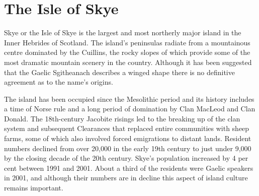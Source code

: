 \documentclass{article}
\begin{document}
\section{The Isle of Skye}

Skye or the Isle of Skye is the largest and most northerly major island
in the Inner Hebrides of Scotland. The island's peninsulas radiate from
a mountainous centre dominated by the Cuillins, the rocky slopes of
which provide some of the most dramatic mountain scenery in the country.
Although it has been suggested that the Gaelic Sgitheanach describes a
winged shape there is no definitive agreement as to the name's origins.

The island has been occupied since the Mesolithic period and its history
includes a time of Norse rule and a long period of domination by Clan
MacLeod and Clan Donald. The 18th-century Jacobite risings led to the
breaking up of the clan system and subsequent Clearances that replaced
entire communities with sheep farms, some of which also involved forced
emigrations to distant lands. Resident numbers declined from over 20,000
in the early 19th century to just under 9,000 by the closing decade of
the 20th century. Skye's population increased by 4 per cent between 1991
and 2001. About a third of the residents were Gaelic speakers in 2001,
and although their numbers are in decline this aspect of island culture
remains important.

\end{document}
